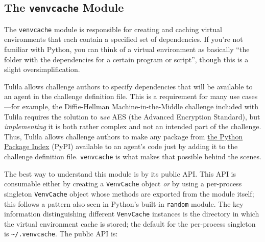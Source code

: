 \documentclass[12pt]{article}
\begin{document}
\subsection{\texorpdfstring{The \texttt{venvcache} Module}{The venvcache Module}}

The \texttt{venvcache} module is responsible for creating and caching virtual environments that each contain a specified set of dependencies. If you're not familiar with Python, you can think of a virtual environment as basically ``the folder with the dependencies for a certain program or script'', though this is a slight oversimplification.

Tulila allows challenge authors to specify dependencies that will be available to an agent in the challenge definition file. This is a requirement for many use cases---for example, the Diffie-Hellman Machine-in-the-Middle challenge included with Tulila requires the solution to \textit{use} AES (the Advanced Encryption Standard), but \textit{implementing} it is both rather complex and not an intended part of the challenge. Thus, Tulila allows challenge authors to make any package from \href{https://pypi.org/}{the Python} \href{https://pypi.org/}{Package Index} (PyPI) available to an agent's code just by adding it to the challenge definition file. \texttt{venvcache} is what makes that possible behind the scenes.

The best way to understand this module is by its public API. This API is consumable either by creating a \texttt{VenvCache} object \textit{or} by using a per-process singleton \texttt{VenvCache} object whose methods are exported from the module itself; this follows a pattern also seen in Python's built-in \texttt{random} module. The key information distinguishing different \texttt{VenvCache} instances is the directory in which the virtual environment cache is stored; the default for the per-process singleton is \texttt{\textasciitilde{}/.venvcache}. The public API is:
\end{document}

